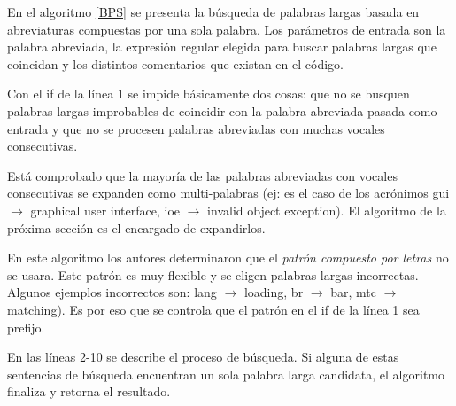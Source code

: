 \documentclass[a4paper,12pt]{report}
\begin{document}

En el algoritmo \ref{BPS} se presenta la búsqueda de palabras largas basada en abreviaturas compuestas por una sola palabra. Los parámetros de entrada son la palabra abreviada, la expresión regular elegida para buscar palabras largas que coincidan y los distintos comentarios que existan en el código.

Con el \textsf{if} de la línea 1 se impide básicamente dos cosas: que no se busquen palabras largas improbables de coincidir con la palabra abreviada pasada como entrada y que no se procesen palabras abreviadas con muchas vocales consecutivas. 

Está comprobado que la mayoría de las palabras abreviadas con vocales consecutivas se expanden como multi-palabras (ej: es el caso de los acrónimos \textsf{gui} $\rightarrow$ \textsf{graphical user interface}, \textsf{ioe} $\rightarrow$ \textsf{invalid object exception}). El algoritmo de la próxima sección es el encargado de expandirlos.

En este algoritmo los autores determinaron que el \textit{patrón compuesto por letras} no se usara. Este patrón es muy flexible y se eligen palabras largas incorrectas. Algunos ejemplos incorrectos son: \textsf{lang} $\rightarrow$ \textsf{loading}, \textsf{br} $\rightarrow$ \textsf{bar}, \textsf{mtc} $\rightarrow$ \textsf{matching}). Es por eso que se controla que el patrón en el \textsf{if} de la línea 1 sea prefijo.

En las líneas 2-10 se describe el proceso de búsqueda. Si alguna de estas sentencias de búsqueda encuentran un sola palabra larga candidata, el algoritmo finaliza y retorna el resultado. 
\end{document}
